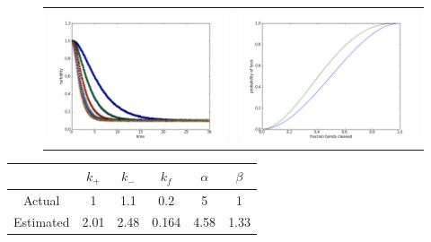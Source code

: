 \documentclass[11pt]{amsart}
\begin{document}
\begin{figure}[htbp] %
   \begin{tabular}{c c}
   \includegraphics[width=3.5in]{turbidity2.png}& 
   \includegraphics[width=3.5in]{susceptibility2.png}  
   \end{tabular}
\end{figure}

\begin{center}
    \begin{tabular}{ | c | c | c | c | c | c |}
    \hline
     & $k_{+}$ & $k_{-}$ & $k_{f}$ & $\alpha$ & $\beta$\\ \hline
    Actual & 1 &1.1 & 0.2  & 5 & 1\\ \hline
    Estimated & 2.01& 2.48  & 0.164  & 4.58 &1.33 \\ \hline
    \hline
    \end{tabular}
\end{center}
\end{document}
